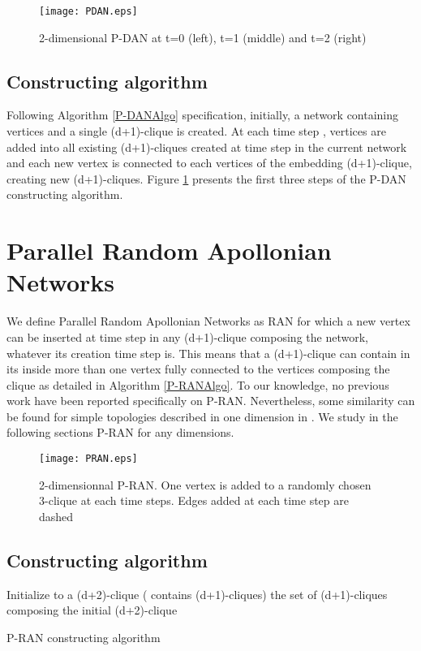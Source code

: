 \documentclass[11pt]{iopart}
\begin{document}
\begin{figure}[htbp]
\centering
\texttt{[image: PDAN.eps]}
\caption{2-dimensional P-DAN at t=0 (left), t=1 (middle) and t=2 (right)}
\label{PDANconstruct}
\end{figure}

\subsection{Constructing algorithm}


Following Algorithm \ref{P-DANAlgo} specification, initially, a network containing  vertices and a single (d+1)-clique is created.
At each time step ,  vertices are added into all existing (d+1)-cliques created at time step  in the current network and each new vertex is connected to each vertices of the embedding (d+1)-clique, creating  new (d+1)-cliques. Figure \ref{PDANconstruct} presents the first three steps of the P-DAN constructing algorithm.

\section{Parallel Random Apollonian Networks}
We define Parallel Random Apollonian Networks as RAN for which a new vertex can be inserted at time step  in any (d+1)-clique composing the network, whatever its creation time step is. This means that a (d+1)-clique can contain in its inside more than one vertex fully connected to the vertices composing the clique as detailed in Algorithm \ref{P-RANAlgo}.
To our knowledge, no previous work have been reported specifically on P-RAN.  Nevertheless, some similarity can be found for  simple topologies described in one dimension in \cite{Dorogovtsev:cond-mat0011115}. We study in the following sections P-RAN for any dimensions.

\begin{figure}[htbp]
\centering
\texttt{[image: PRAN.eps]}
\caption{2-dimensionnal P-RAN. One vertex is added to a randomly chosen 3-clique at each time steps. Edges added at each time step are dashed}
\label{PRANconstruct}
\end{figure}

\subsection{Constructing algorithm}

\begin{algorithm}[H]
  \SetLine
  
  \;
  Initialize  to a (d+2)-clique ( contains  (d+1)-cliques)\; 
   the set of (d+1)-cliques composing the initial (d+2)-clique \;
  \caption{P-RAN constructing algorithm}
  \label{P-RANAlgo}
\end{algorithm}
\end{document}
